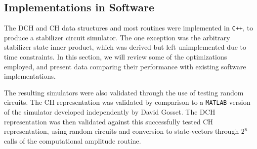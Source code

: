 \subsection{Implementations in Software}\label{sec:stabilizer_simulators}
The DCH and CH data structures and most routines were implemented in \texttt{C++}, to produce a stabilizer circuit simulator. The one exception was the arbitrary stabilizer state inner product, which was derived but left unimplemented due to time constraints. In this section, we will review some of the optimizations employed, and present data comparing their performance with existing software implementations.\par
The resulting simulators were also validated through the use of testing random circuits. The CH representation was validated by comparison to a \texttt{MATLAB} version of the simulator developed independently by David Gosset. The DCH representation was then validated against this successfully tested CH representation, using random circuits and conversion to state-vectors through $2^{n}$ calls of the computational amplitude routine.
